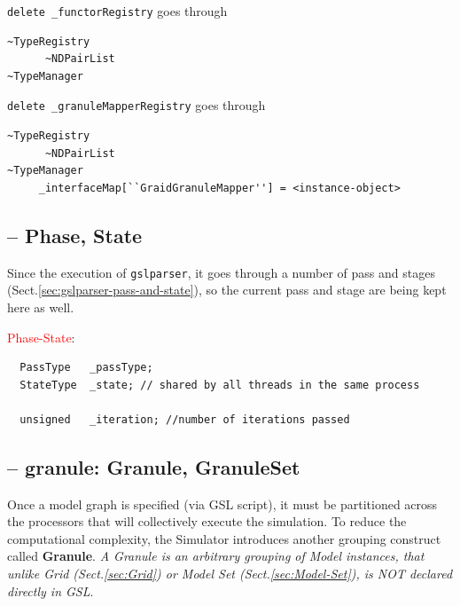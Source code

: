 \verb!delete _functorRegistry! goes through
\begin{verbatim}
~TypeRegistry
      ~NDPairList
~TypeManager

\end{verbatim}

\verb!delete _granuleMapperRegistry! goes through
\begin{verbatim}
~TypeRegistry
      ~NDPairList
~TypeManager
     _interfaceMap[``GraidGranuleMapper''] = <instance-object>

\end{verbatim}

\subsection{-- Phase, State}

Since the execution of \verb!gslparser!, it goes through a number of pass and
stages (Sect.\ref{sec:gslparser-pass-and-state}), so the current pass and stage
are being kept here as well.

\textcolor{red}{Phase-State}:
\begin{lstlisting}
  PassType   _passType;
  StateType  _state; // shared by all threads in the same process

  unsigned   _iteration; //number of iterations passed

\end{lstlisting}

\subsection{-- granule: Granule, GranuleSet}
\label{sec:gslparser-granule}
\label{sec:Granule}
\label{sec:GranuleSet}

Once a model graph is specified (via GSL script), it must be partitioned across
the processors that will collectively execute the simulation. To reduce the
computational complexity, the Simulator introduces another grouping construct
called {\bf Granule}. {\it A Granule is an arbitrary grouping of Model
instances, that unlike Grid (Sect.\ref{sec:Grid}) or Model Set
(Sect.\ref{sec:Model-Set}), is NOT declared directly in GSL}.

